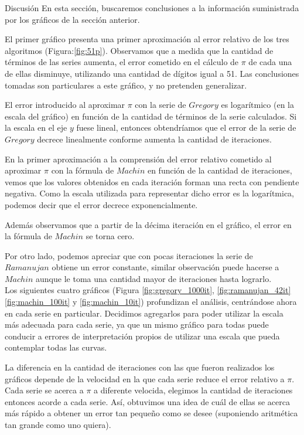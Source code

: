 \begin{section}{Discusión}
	En esta sección, buscaremos conclusiones a la información suministrada por los gráficos de la sección anterior.
	
	El primer gráfico presenta una primer aproximación al error relativo de los tres algoritmos (Figura:\ref{fig:51p}).
	Observamos que a medida que la cantidad de términos de las series aumenta, el error cometido en el cálculo de $\pi$ de cada una de ellas disminuye, utilizando una cantidad de dígitos igual a 51. Las conclusiones tomadas son particulares a este gráfico, y no pretenden generalizar.
	
	El error introducido al aproximar $\pi$ con la serie de $Gregory$ es logarítmico (en la escala del gráfico) en función de la cantidad de términos de la serie calculados. Si la escala en el eje $y$ fuese lineal, entonces obtendríamos que el error de la serie de $Gregory$ decrece linealmente conforme aumenta la cantidad de iteraciones.
	
	En la primer aproximación a la comprensión del error relativo cometido al aproximar $\pi$ con la fórmula de $Machin$ en función de la cantidad de iteraciones, vemos que los valores obtenidos en cada iteración forman una recta con pendiente negativa. Como la escala utilizada para representar dicho error es la logarítmica, podemos decir que el error decrece exponencialmente.
	
	Además observamos que a partir de la décima iteración en el gráfico, el error en la fórmula de $Machin$ se torna cero.
	
	Por otro lado, podemos apreciar que con pocas iteraciones la serie de $Ramanujan$ obtiene un error constante, similar observación puede hacerse a $Machin$ aunque le toma una cantidad mayor de iteraciones hasta lograrlo.\\
	
	Los siguientes cuatro gráficos (Figura \ref{fig:gregory_1000it}, \ref{fig:ramanujan_42it} \ref{fig:machin_100it} y \ref{fig:machin_10it}) profundizan el análisis, centrándose ahora en cada serie en particular. Decidimos agregarlos para poder utilizar la escala más adecuada para cada serie, ya que un mismo gráfico para todas puede conducir a errores de interpretación propios de utilizar una escala que pueda contemplar todas las curvas.
	
	La diferencia en la cantidad de iteraciones con las que fueron realizados los gráficos depende de la velocidad en la que cada serie reduce el error relativo a $\pi$. Cada serie se acerca a $\pi$ a diferente velocida, elegimos la cantidad de iteraciones entonces acorde a cada serie. Así, obtuvimos una idea de cuál de ellas se acerca más rápido a obtener un error tan pequeño como se desee (suponiendo aritmética tan grande como uno quiera).
	

\end{section}
